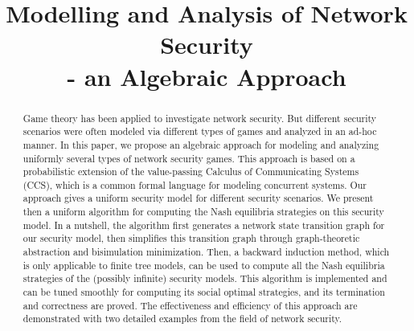 \documentclass[10pt, conference, compsocconf]{IEEEtran}
\begin{document}
\title{Modelling and Analysis of Network Security\\
- an Algebraic Approach}

\author{
\and
{}
\and
{}
}
\maketitle

\begin{abstract}
Game theory has been applied to investigate network security. But different security scenarios were often modeled via different types of games and analyzed in an ad-hoc manner. In this paper, we propose an algebraic approach for modeling and analyzing uniformly several types of network security games.
This approach is based on a probabilistic extension of the value-passing Calculus of Communicating Systems (CCS), which is a common formal language for modeling concurrent systems. Our approach gives a uniform security model for different security scenarios.
We present then a uniform algorithm for computing the Nash equilibria strategies on this security model.
In a nutshell, the algorithm first generates a network state transition graph for our security model, then simplifies this transition graph through graph-theoretic abstraction and bisimulation minimization.
Then, a backward induction method, which is only applicable to finite tree models, can be used to compute all the Nash equilibria strategies of the (possibly infinite) security models.
This algorithm is implemented and can be tuned smoothly for computing its social optimal strategies, and its termination and correctness are proved.
The effectiveness and efficiency of this approach are demonstrated with two detailed examples from the field of network security.
\end{abstract}
\end{document}
